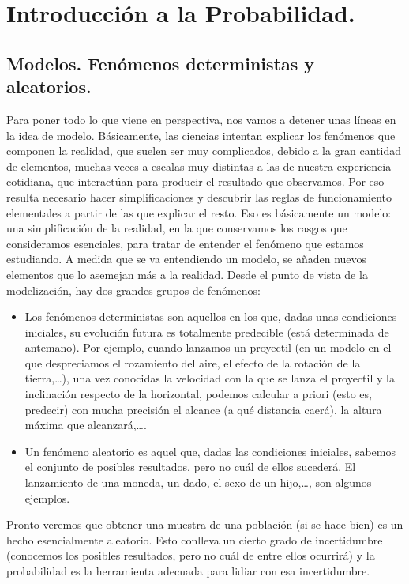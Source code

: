 
\section*{Introducción a la Probabilidad.}
\label{part02:intro}

\subsection*{Modelos. Fenómenos deterministas y aleatorios.}

Para poner todo lo que viene en perspectiva, nos vamos a detener unas líneas en la idea de {\sf
modelo}. Básicamente, las ciencias intentan explicar los fen\'omenos que componen la
realidad, que suelen ser muy complicados, debido a la gran cantidad de elementos, muchas veces a
escalas muy distintas a las de nuestra experiencia cotidiana, que interactúan para producir el
resultado que observamos. Por eso resulta necesario hacer simplificaciones y descubrir las reglas
de funcionamiento elementales a partir de las que explicar el resto. Eso es básicamente un modelo:
una simplificación de la realidad, en la que conservamos los rasgos que consideramos esenciales,
para tratar de entender el fenómeno que estamos estudiando. A medida que se va entendiendo un
modelo, se añaden nuevos elementos que lo asemejan m\'as a la realidad. Desde el punto de vista de
la modelizaci\'on, hay dos grandes grupos de fen\'omenos:
\begin{itemize}
    \item Los {\sf fenómenos deterministas}  son aquellos en los
        que, dadas unas condiciones iniciales, su evoluci\'on futura es totalmente predecible
        (est\'a determinada de antemano). Por ejemplo, cuando lanzamos un proyectil (en un modelo
        en el que despreciamos el rozamiento del aire, el efecto de la rotaci\'on de la 			
        tierra,\dots), una vez conocidas la velocidad con la que se lanza el proyectil y la
        inclinaci\'on respecto de la horizontal, podemos calcular a priori (esto es, predecir)
        con mucha precisión el alcance (a qu\'e distancia caer\'a), la altura m\'axima que
        alcanzar\'a,\dots.
    \item Un {\sf fen\'omeno aleatorio}  	es aquel que, dadas las
        condiciones iniciales, sabemos el conjunto de posibles resultados, pero no cu\'al de
        ellos suceder\'a. El lanzamiento de una moneda, un dado, el sexo de un hijo,\dots, son
        algunos ejemplos.
\end{itemize}
Pronto veremos que obtener una muestra de una poblaci\'on (si se hace bien) es un hecho
esencialmente aleatorio. Esto conlleva un cierto grado de incertidumbre (conocemos los posibles
resultados, pero no cu\'al de entre ellos ocurrirá) y la probabilidad es la herramienta adecuada
para lidiar con esa incertidumbre.


